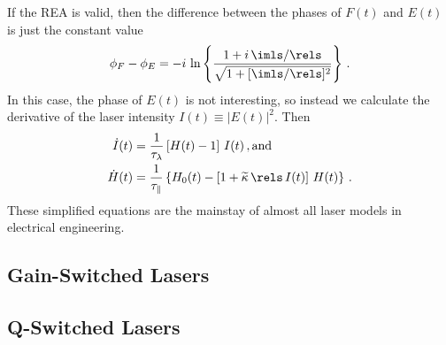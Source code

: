  If the REA is valid, then the difference between the phases of $F(t)$ and $E(t)$ is just the constant value
\begin{equation}
  \phi_F - \phi_E = -i\, \ln\left\{ \frac{1 + i\, \imls / \rels}{\sqrt{1 + [\imls / \rels]^2}} \right\}\, .
\end{equation}
In this case, the phase of $E(t)$ is not interesting, so instead we calculate the derivative of the laser intensity $I(t) \equiv |E(t)|^2$. Then
\begin{align}
  \dot{I}(t) &= \frac{1}{\tau_\lambda} \left[H(t) - 1\right]\, I(t)\, , \textrm{and} \\
  \dot{H}(t) &= \frac{1}{\tau_\parallel} \left\{ H_0(t) - \left[ 1 + \widetilde{\kappa}\, \rels\, I(t) \right]\, H(t) \right\}\, .
\end{align}
 These simplified equations are the mainstay of almost all laser models in electrical engineering.

 \subsection{Gain-Switched Lasers\label{sct:laser_dynamics_1d_sml_gsl}}
 
 \subsection{Q-Switched Lasers\label{sct:laser_dynamics_1d_sml_qsl}}

